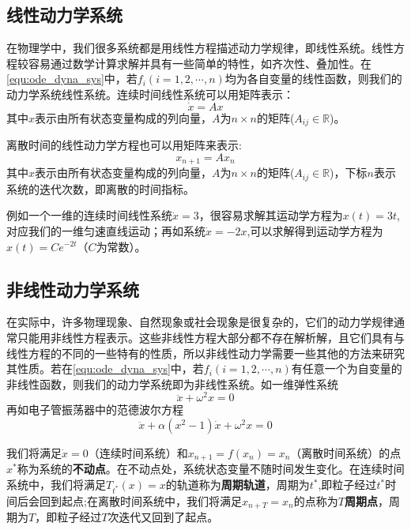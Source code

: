 \subsection{线性动力学系统}
在物理学中，我们很多系统都是用线性方程描述动力学规律，即线性系统。线性方程较容易通过数学计算求解并具有一些简单的特性\cite{liuyanqing2000non}，如齐次性、叠加性。在\eqref{equ:ode_dyna_sys}中，若$f_i(i=1,2,\cdots,n)$均为各自变量的线性函数，则我们的动力学系统线性系统。连续时间线性系统可以用矩阵表示：
\begin{equation}
    \dot{x}=Ax
\end{equation}
其中$x$表示由所有状态变量构成的列向量，$A$为$n\times n$的矩阵($A_{ij}\in\mathbb{R}$)。

离散时间的线性动力学方程也可以用矩阵来表示:
\begin{equation}
    x_{n+1}=Ax_n
\end{equation}
其中$x$表示由所有状态变量构成的列向量，$A$为$n\times n$的矩阵($A_{ij}\in\mathbb{R}$)，下标$n$表示系统的迭代次数，即离散的时间指标。

例如一个一维的连续时间线性系统$\dot{x}=3$，很容易求解其运动学方程为$x(t)=3t$,对应我们的一维匀速直线运动；再如系统$\dot{x}=-2x$,可以求解得到运动学方程为$x(t)=Ce^{-2t}$（$C$为常数）。

\subsection{非线性动力学系统}
在实际中，许多物理现象、自然现象或社会现象是很复杂的，它们的动力学规律通常只能用非线性方程表示。这些非线性方程大部分都不存在解析解，且它们具有与线性方程的不同的一些特有的性质，所以非线性动力学需要一些其他的方法来研究其性质。若在\eqref{equ:ode_dyna_sys}中，若$f_i(i=1,2,\cdots,n)$有任意一个为自变量的非线性函数，则我们的动力学系统即为非线性系统。如一维弹性系统
\begin{equation}
    \ddot{x}+\omega^2x=0
\end{equation}
再如电子管振荡器中的范德波尔方程\cite{strogatz2001nonlinear}
\begin{equation}
    \ddot{x}+\alpha(x^2-1)\dot{x}+\omega^2x=0
\end{equation}

我们将满足$\dot{x}=0$（连续时间系统）和$x_{n+1}=f(x_n)=x_n$（离散时间系统）的点$x^*$称为系统的\textbf{不动点}。在不动点处，系统状态变量不随时间发生变化。在连续时间系统中，我们将满足$T_{t^*}(x)=x$的轨道称为\textbf{周期轨道}，周期为$t^*$,即粒子经过$t^*$时间后会回到起点;在离散时间系统中，我们将满足$x_{n+T}=x_n$的点称为\textbf{$T$周期点}，周期为$T$，即粒子经过$T$次迭代又回到了起点。

